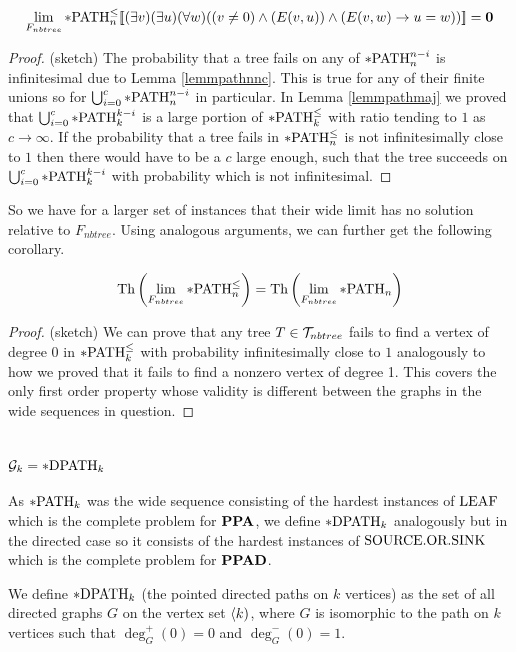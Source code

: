 \begin{thrm}
\[\lim_{F_{nbtree}}*\text{PATH}^\leq_n[\![(\exists v)(\exists u)(\forall w)((v\not=0)\land (E(v,u)) \land(E(v,w) \to u=w))]\!]=\textbf{0}\]
\end{thrm}
\begin{proof}(sketch)
The probability that a tree fails on any of $*\text{PATH}_n^{n-i}$ is infinitesimal due to Lemma \ref{lemmpathnnc}. This is true for any of their finite unions so for $\bigcup_{i=0}^c*\text{PATH}^{n-i}_n$ in particular. In Lemma \ref{lemmpathmaj} we proved that $\bigcup_{i=0}^c*\text{PATH}^{k-i}_k$ is a large portion of $*\text{PATH}^\leq_k$ with ratio tending to $1$ as $c\to\infty$. If the probability that a tree fails in $*\text{PATH}^\leq_n$ is not infinitesimally close to $1$ then there would have to be a $c$ large enough, such that the tree succeeds on $\bigcup_{i=0}^c*\text{PATH}_k^{k-i}$ with probability which is not infinitesimal.
\end{proof}

So we have for a larger set of instances that their wide limit has no solution relative to $F_{nbtree}$. Using analogous arguments, we can further get the following corollary.

\begin{crll}\label{crllpPATHl}
\[\text{Th}\left(\lim_{F_{nbtree}}*\text{PATH}^\leq_n\right)=\text{Th}\left(\lim_{F_{nbtree}}*\text{PATH}_n\right)\]
\end{crll}
\begin{proof}(sketch)
We can prove that any tree $T\in\mathcal{T}_{nbtree}$ fails to find a vertex of degree 0 in $*\text{PATH}^\leq_k$ with probability infinitesimally close to $1$ analogously to how we proved that it fails to find a nonzero vertex of degree 1. This covers the only first order property whose validity is different between the graphs in the wide sequences in question.
\end{proof}



\section{\texorpdfstring{$\mathcal{G}_k=*\text{DPATH}_k$}{Gk=*DPATHk}}\label{secpDPATH}

As $*\text{PATH}_k$ was the wide sequence consisting of the hardest instances of $\text{LEAF}$ which is the complete problem for $\textbf{PPA}$, we define $*\text{DPATH}_k$ analogously but in the directed case so it consists of the hardest instances of $\text{SOURCE.OR.SINK}$ which is the complete problem for $\textbf{PPAD}$.


\begin{defi}
We define $*\text{DPATH}_k$ (the pointed directed paths on $k$ vertices) as the set of all directed graphs $G$ on the vertex set $\langle k)$, where $G$ is isomorphic to the path on $k$ vertices such that $\deg_G^{+}(0)=0$ and $\deg_G^{-}(0)=1$.
\end{defi}

